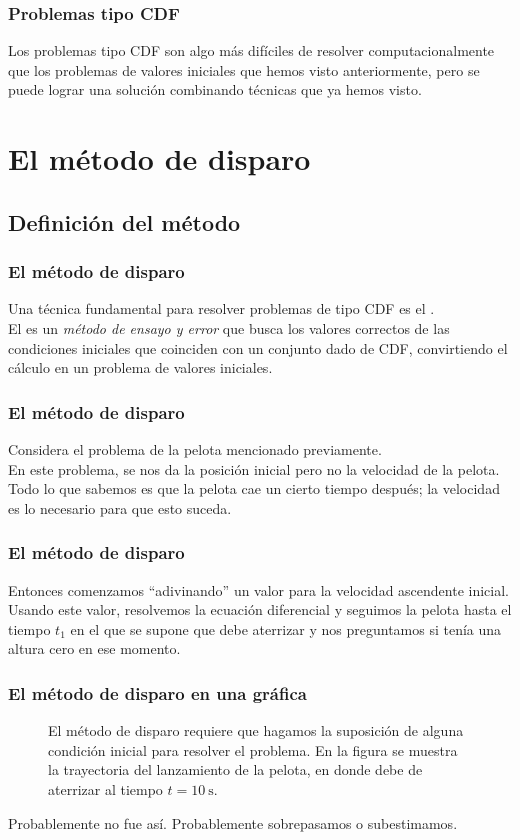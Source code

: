 \begin{frame}
\frametitle{Problemas tipo CDF}
Los problemas tipo CDF son algo más difíciles de resolver computacionalmente que los problemas de valores iniciales que hemos visto anteriormente, pero se puede lograr una solución combinando técnicas que ya hemos visto.
\end{frame}
\section{El método de disparo}
\subsection{Definición del método}
\begin{frame}
\frametitle{El método de disparo}
Una técnica fundamental para resolver problemas de tipo CDF es el .
\\
\bigskip
El  es un \emph{método de ensayo y error} que busca los valores correctos de las condiciones iniciales que coinciden con un conjunto dado de CDF, convirtiendo el cálculo en un problema de valores iniciales.
\end{frame}
\begin{frame}
\frametitle{El método de disparo}
Considera el problema de la pelota mencionado previamente.
\\
\bigskip
En este problema, se nos da la posición inicial pero no la velocidad de la pelota. Todo lo que sabemos es que la pelota cae un cierto tiempo después; la velocidad es lo necesario para que esto suceda.
\end{frame}
\begin{frame}
\frametitle{El método de disparo}
Entonces comenzamos \enquote{adivinando} un valor para la velocidad ascendente inicial.
\\
\bigskip
Usando este valor, resolvemos la ecuación diferencial y seguimos la pelota hasta el tiempo $t_{1}$ en el que se supone que debe aterrizar y nos preguntamos si tenía una altura cero en ese momento.
\end{frame}
\begin{frame}
\frametitle{El método de disparo en una gráfica}
\begin{figure}[h!]
    \centering
    
    \caption{El método de disparo requiere que hagamos la suposición de alguna condición inicial para resolver el problema. En la figura se muestra la trayectoria del lanzamiento de la pelota, en donde debe de aterrizar al tiempo $t = \SI{10}{\second}$.}
\end{figure}
\fontsize{12}{12}\selectfont
Probablemente no fue así. Probablemente sobrepasamos o subestimamos.
\end{frame}
